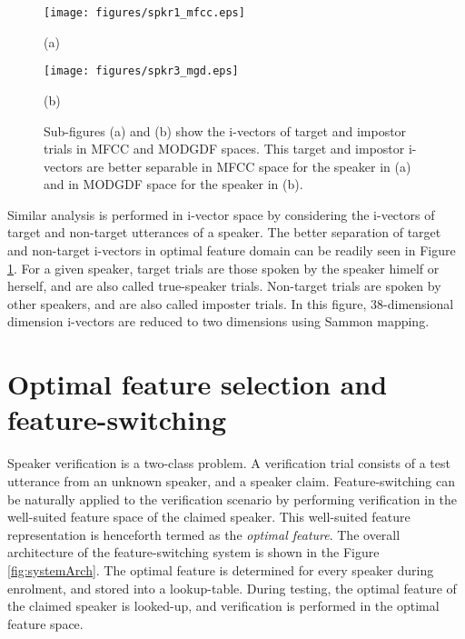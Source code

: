 \documentclass{article}
\begin{document}
\begin{figure}[h!tb]
\centering \hspace{-5cm}
\begin{minipage}{0.65\textwidth}
\centering 
\texttt{[image: figures/spkr1\_mfcc.eps]}
\caption*{(a)}
\label{fig:subfig3}
\end{minipage}%
\begin{minipage}{0.25\textwidth}
\centering \hspace{10cm}
\texttt{[image: figures/spkr3\_mgd.eps]}
\caption*{(b)}
\label{fig:subfig4}
\end{minipage}
\caption{Sub-figures (a) and (b) show the i-vectors of target and impostor
trials in MFCC and MODGDF spaces. This target and impostor i-vectors are better
separable in MFCC space for the speaker in (a) and in MODGDF space for the
speaker  in (b).}
\label{fig:ivec_separation}
\end{figure}

Similar analysis is performed in i-vector space by considering the i-vectors of
target and non-target utterances of a speaker. The better separation of target
and non-target i-vectors in optimal feature domain can be readily seen in 
Figure \ref{fig:ivec_separation}. For a given speaker, target trials are those
spoken by the speaker himelf or herself, and are also called true-speaker
trials. Non-target trials are spoken by other speakers, and are also called
imposter trials. In this figure, 38-dimensional dimension i-vectors are
reduced to two dimensions using Sammon mapping.


\section{Optimal feature selection and feature-switching}
\label{sec:optFeat}

Speaker verification is a two-class problem. A verification trial consists of a
test utterance from an unknown speaker, and a speaker claim. Feature-switching
can be naturally applied to the verification scenario by performing
verification in the well-suited feature space of the claimed speaker. This
well-suited feature representation is henceforth termed as the \emph{optimal
feature}. The overall architecture of the feature-switching system is shown in the
Figure \ref{fig:systemArch}. The optimal feature is determined for every speaker
during enrolment, and stored into a lookup-table. During testing, the optimal
feature of the claimed speaker is looked-up, and verification is performed in
the optimal feature space.
\end{document}
